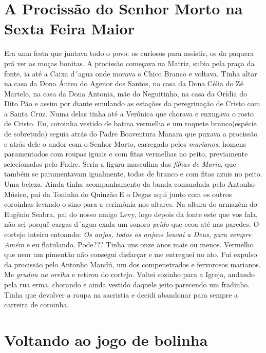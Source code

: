 \documentclass[12pt,brazil,]{book}
\begin{document}
\section{A Procissão do Senhor Morto na Sexta Feira
Maior}\label{a-procissuxe3o-do-senhor-morto-na-sexta-feira-maior}

Era uma festa que juntava todo o povo: os curiosos para assistir, os da
paquera prá ver as moças bonitas. A procissão começava na Matriz, subia
pela praça da fonte, ia até a Caixa d´agua onde morava o Chico Branco e
voltava. Tinha altar na casa da Dona Áurea do Agenor dos Santos, na casa
da Dona Célia do Zé Martelo, na casa da Dona Antonia, mãe do Neguitinho,
na casa da Orídia do Dito Pão e assim por diante emulando as estações da
peregrinação de Cristo com a Santa Cruz. Numa delas tinha até a Verônica
que chorava e enxugava o rosto de Cristo. Eu, coroinha vestido de batina
vermelha e um roquete branco(espécie de sobretudo) seguia atrás do Padre
Boaventura Manara que puxava a procissão e atrás dele o andor com o
Senhor Morto, carregado pelos \emph{marianos}, homens paramentados com
roupas iguais e com fitas vermelhas no peito, previamente selecionados
pelo Padre. Seria a figura masculina das \emph{filhas de Maria}, que
também se paramentavam igualmente, todas de branco e com fitas azuis no
peito. Uma beleza. Ainda tinha acompanhamento da banda comandada pelo
Antonho Músico, pai da Toninha do Quinzão E o Degas aqui junto com os
outros coroinhas levando o sino para a cerimônia nos altares. Na altura
do armazém do Eugênio Seabra, pai do nosso amigo Levy, logo depois da
fonte este que vos fala, não sei porquê cargas d´agua exala um sonoro
\emph{peido} que ecoa até nas paredes. O cortejo inteiro entoando:
\emph{Os anjos, todos os anjoos louvai a Deus, para sempre Amém} e eu
flatulando. Pode??? Tinha uns onze anos mais ou menos. Vermelho que nem
um pimentão não consegui disfarçar e me entreguei no ato. Fui expulso da
procissão pelo Antonho Mandú, um dos compenetrados e fervorosos
marianos. Me \emph{grudou na orelha} e retirou do cortejo. Voltei
sozinho para a Igreja, andando pela rua erma, chorando e ainda vestido
daquele jeito parecendo um fradinho. Tinha que devolver a roupa na
sacristia e decidi abandonar para sempre a carreira de coroinha.

\section{Voltando ao jogo de bolinha}\label{voltando-ao-jogo-de-bolinha}
\end{document}
